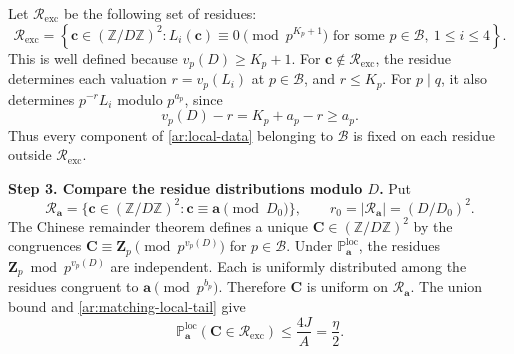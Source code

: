 \documentclass[twoside]{aomart}
\makeatletter
\theoremstyle{paperplain}
\theoremstyle{paperdefinition}
\renewenvironment{proof}[1][\proofname]{\par\pushQED{\qed}%
  \normalfont\topsep6\p@\@plus3\p@\relax\trivlist
  \item[\hskip\labelsep\itshape #1\@addpunct{.}]\ignorespaces
}{\popQED\endtrivlist\@endpefalse}
\newcommand{\Z}{\mathbb Z}
\newcommand{\Pp}{\mathbb P}
\numberwithin{equation}{section}
\makeatother
\begin{document}
\begin{proof}
Let $\mathcal R_{\mathrm{exc}}$ be the following set of residues:
\begin{equation*}
 \mathcal R_{\mathrm{exc}}
 =\left\{\mathbf c\in(\Z/D\Z)^2:
    L_i(\mathbf c)\equiv0\pmod{p^{K_p+1}}
    \text{ for some }p\in\mathcal B,\ 1\le i\le4\right\}.
 \end{equation*}
This is well defined because $v_p(D)\ge K_p+1$.
For $\mathbf c\notin\mathcal R_{\mathrm{exc}}$, the residue determines
each valuation $r=v_p(L_i)$ at $p\in\mathcal B$, and $r\le K_p$.
For $p\mid q$, it also determines $p^{-r}L_i$ modulo $p^{a_p}$, since
\begin{equation*}
 v_p(D)-r=K_p+a_p-r\ge a_p.
 \end{equation*}
Thus every component of \eqref{ar:local-data} belonging to $\mathcal B$
is fixed on each residue outside $\mathcal R_{\mathrm{exc}}$.

\par
\medskip
\noindent\textbf{Step 3. Compare the residue distributions modulo $D$.}
Put
\begin{equation*}
 \mathcal R_{\mathbf a}
 =\{\mathbf c\in(\Z/D\Z)^2:
             \mathbf c\equiv\mathbf a\pmod{D_0}\},
 \qquad r_0=|\mathcal R_{\mathbf a}|=(D/D_0)^2.
 \end{equation*}
The Chinese remainder theorem defines a unique
$\mathbf C\in(\Z/D\Z)^2$ by the congruences
$\mathbf C\equiv\mathbf Z_p\pmod{p^{v_p(D)}}$ for $p\in\mathcal B$.
Under $\Pp^{\mathrm{loc}}_{\mathbf a}$, the residues
$\mathbf Z_p\bmod p^{v_p(D)}$ are independent.
Each is uniformly distributed among the residues congruent to
$\mathbf a\pmod{p^{b_p}}$.
Therefore $\mathbf C$ is uniform on $\mathcal R_{\mathbf a}$.
The union bound and \eqref{ar:matching-local-tail} give
\begin{equation}
 \Pp^{\mathrm{loc}}_{\mathbf a}
       (\mathbf C\in\mathcal R_{\mathrm{exc}})
 \le\frac{4J}{A}=\frac\eta2.
 \label{ar:matching-local-exception}
\end{equation}


\end{proof}
\end{document}
